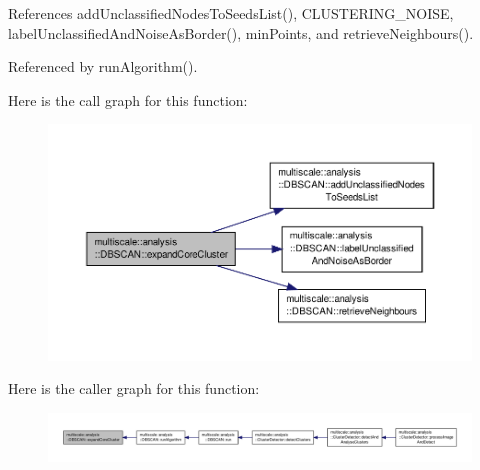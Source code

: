 References add\-Unclassified\-Nodes\-To\-Seeds\-List(), C\-L\-U\-S\-T\-E\-R\-I\-N\-G\-\_\-\-N\-O\-I\-S\-E, label\-Unclassified\-And\-Noise\-As\-Border(), min\-Points, and retrieve\-Neighbours().



Referenced by run\-Algorithm().



Here is the call graph for this function\-:\nopagebreak
\begin{figure}[H]
\begin{center}
\leavevmode
\includegraphics[width=350pt]{classmultiscale_1_1analysis_1_1DBSCAN_a400c4e9fb1d9e9bafa970b33912a5ce1_cgraph}
\end{center}
\end{figure}




Here is the caller graph for this function\-:\nopagebreak
\begin{figure}[H]
\begin{center}
\leavevmode
\includegraphics[width=350pt]{classmultiscale_1_1analysis_1_1DBSCAN_a400c4e9fb1d9e9bafa970b33912a5ce1_icgraph}
\end{center}
\end{figure}


